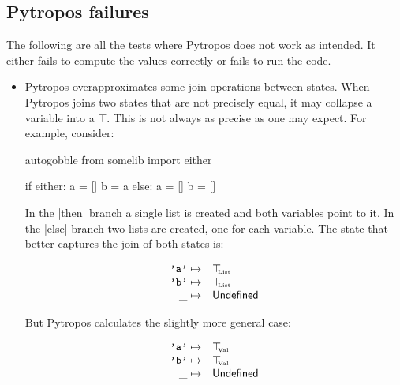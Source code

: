 \subsection{Pytropos failures}

The following are all the tests where Pytropos does not work as intended. It either fails to compute the values correctly or fails to run the code.

\begin{itemize}

\item Pytropos overapproximates some join operations between states.
  When Pytropos joins two states that are not precisely equal, it may collapse a
  variable into a $\top$. This is not always as precise as one may expect. For example,
  consider:

  \begin{pythoncode*}{autogobble}
    from somelib import either

    if either:
        a = []
        b = a
    else:
        a = []
        b = []
  \end{pythoncode*}

  In the \pycode|then| branch a single list is created and both variables point to it.
  In the \pycode|else| branch two lists are created, one for each variable. The state that
  better captures the join of both states is:

  \[\begin{array}{rl}
      \texttt{'a'} \mapsto& \top_{\hspace{-1mm}{\text{\tiny{List}}}} \\
      \texttt{'b'} \mapsto& \top_{\hspace{-1mm}{\text{\tiny{List}}}} \\
      \_ \mapsto& \mathsf{Undefined} \\
  \end{array}\]


  But Pytropos calculates the slightly more general case:

  \[\begin{array}{rl}
      \texttt{'a'} \mapsto& \top_{\hspace{-1mm}{\text{\tiny{Val}}}} \\
      \texttt{'b'} \mapsto& \top_{\hspace{-1mm}{\text{\tiny{Val}}}} \\
      \_ \mapsto& \mathsf{Undefined} \\
  \end{array}\]



\end{itemize}

